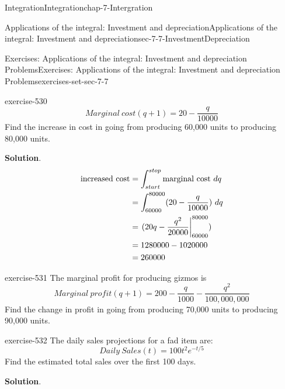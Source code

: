 \documentclass[oneside,10pt,]{book}
\numberwithin{equation}{section}
\newcommand{\amp}{&}
\begin{document}
\begin{chapterptx}{Integration}{}{Integration}{}{}{chap-7-Intergration}
\begin{sectionptx}{Applications of the integral: Investment and depreciation}{}{Applications of the integral: Investment and depreciation}{}{}{sec-7-7-InvestmentDepreciation}
\begin{exercises-subsection-numberless}{Exercises: Applications of the integral: Investment and depreciation Problems}{}{Exercises: Applications of the integral: Investment and depreciation Problems}{}{}{exercises-set-sec-7-7}
\begin{divisionexercise}{1}{}{}{exercise-530}
%
\begin{equation*}
Marginal\ cost(q+1)=20-\frac{q}{10000}
\end{equation*}
\hypertarget{p-3054}{}%
Find the increase in cost in going from producing 60,000 units to producing 80,000 units.%
\par\smallskip%
\noindent\textbf{Solution}.\hypertarget{solution-268}{}\quad%
%
\begin{align*}
\hbox{increased cost}\amp=\int_{start}^{stop}\hbox{marginal cost}\ dq\\
\amp=\int_{60000}^{80000}(20-\frac{q}{10000})\ dq\\
\amp=\left.(20q-\frac{q^2}{20000}\right|_{60000}^{80000})\ \\
\amp=1280000-1020000\\
\amp=260000
\end{align*}
\end{divisionexercise}%
\begin{divisionexercise}{2}{}{}{exercise-531}%
\hypertarget{p-3055}{}%
The marginal profit for producing gizmos is%
%
\begin{equation*}
Marginal\ profit(q+1)=200-\frac{q}{1000}-\frac{q^2}{100,000,000}
\end{equation*}
\hypertarget{p-3056}{}%
Find the change in profit in going from producing 70,000 units to producing 90,000 units.%
\end{divisionexercise}%
\begin{divisionexercise}{3}{}{}{exercise-532}%
\hypertarget{p-3057}{}%
The daily sales projections for a fad item are:%
%
\begin{equation*}
Daily\ Sales(t)=100 t^2 e^{-t/5}
\end{equation*}
\hypertarget{p-3058}{}%
Find the estimated total sales over the first 100 days.%
\par\smallskip%
\noindent\textbf{Solution}.\hypertarget{solution-269}{}\quad%
\leavevmode%
\begin{sidebyside}{1}{0.1}{0.1}{0}%
\begin{sbspanel}{0.8}%

\end{sbspanel}
\end{sidebyside}
\end{divisionexercise}
\end{exercises-subsection-numberless}
\end{sectionptx}
\end{chapterptx}
\end{document}
